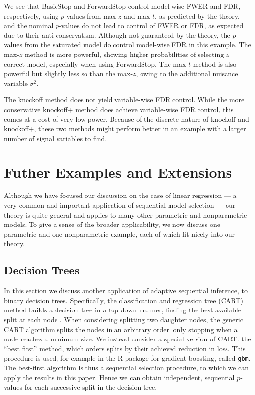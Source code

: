 \documentclass{article}
\begin{document}
We see that BasicStop and ForwardStop control model-wise FWER and FDR, respectively, using $p$-values from max-$z$ and max-$t$, as predicted by the theory, and the nominal $p$-values do not lead to control of FWER or FDR, as expected due to their anti-conservatism. Although not guaranteed by the theory, the $p$-values from the saturated model do control model-wise FDR in this example.  The max-$z$ method is more powerful, showing higher probabilities of selecting a correct model, especially when using ForwardStop. The max-$t$ method is also powerful but slightly less so than the max-$z$, owing to the additional nuisance variable $\sigma^2$.

The knockoff method does not yield variable-wise FDR control. While the more conservative knockoff+ method does achieve variable-wise FDR control, this comes at a cost of very low power. Because of the discrete nature of knockoff and knockoff+, these two methods might perform better in an example with a larger number of signal variables to find.

\section{Futher Examples and Extensions}\label{sec:further-examples}

Although we have focused our discussion on the case of linear regression --- a very common and important application of sequential model selection --- our theory is quite general and applies to many other parametric and nonparametric models. To give a sense of the broader applicability, we now discuss one parametric and one nonparametric example, each of which fit nicely into our theory.

\subsection{Decision Trees}
In this section we discuss another application of adaptive sequential inference, to binary decision trees. Specifically, the classification and regression tree  (CART)  method builds a decision tree in a top down manner, finding the best available split at each node \citep{breiman1984classification}.  When considering splitting two daughter nodes, the generic CART algorithm splits the nodes in an arbitrary order, only stopping when a node reaches a minimum size.  We instead consider a  special version of CART: the ``best first'' method, which orders splits by their achieved reduction in loss. This procedure is used, for example in the R package for gradient boosting, called {\tt gbm}. The best-first algorithm is thus a sequential selection  procedure, to which we can apply the results in this paper. Hence we can obtain independent, sequential $p$-values for each successive split in the decision tree. 
\end{document}
